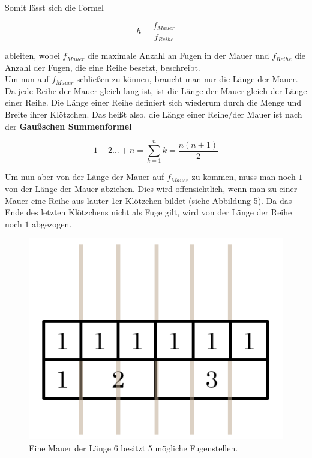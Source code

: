 \documentclass[a4paper,12pt]{article}
\begin{document}
Somit lässt sich die Formel
\begin{center}
\begin{Large}
\[h = \frac{f_{Mauer}}{f_{Reihe}}\]
\end{Large}
\end{center}
ableiten, wobei $f_{Mauer}$ die maximale Anzahl an Fugen in der Mauer und $f_{Reihe}$ die Anzahl der Fugen, die eine Reihe besetzt, beschreibt.
\\[0.4cm]
Um nun auf $f_{Mauer}$ schließen zu können, braucht man nur die Länge der Mauer. Da jede Reihe der Mauer gleich lang ist, ist die Länge der Mauer gleich der Länge einer Reihe. Die Länge einer Reihe definiert sich wiederum durch die Menge und Breite ihrer Klötzchen. Das heißt also, die Länge einer Reihe/der Mauer ist nach der \textbf{Gaußschen Summenformel}
\begin{center}
\begin{Large}
\[1+2...+n = \sum_{k=1}^n k = \frac{n(n+1)}{2}\]
\end{Large}
\end{center}
Um nun aber von der Länge der Mauer auf $f_{Mauer}$ zu kommen, muss man noch $1$ von der Länge der Mauer abziehen. Dies wird offensichtlich, wenn man zu einer Mauer eine Reihe aus lauter 1er Klötzchen bildet (siehe Abbildung 5). Da das Ende des letzten Klötzchens nicht als Fuge gilt, wird von der Länge der Reihe noch $1$ abgezogen.
\begin{figure}[H]
    \centering
    \includegraphics[width=0.5\linewidth]{Bilder/Aufgabe1/Definition_Fugenstellen_Mauer.png}
    \caption{Eine Mauer der Länge 6 besitzt 5 mögliche Fugenstellen.}
\end{figure}
\end{document}
